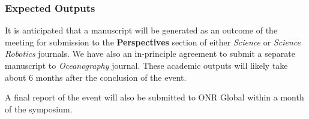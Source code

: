 \subsubsection{Expected Outputs}

It is anticipated that a manuscript will be generated as an outcome of
the meeting for submission to the \textbf{Perspectives} section of
either \emph{Science} or \emph{Science Robotics} journals. We have
also an in-principle agreement to submit a separate manuscript to
\emph{Oceanography} journal. These academic outputs will likely take
about 6 months after the conclusion of the event. 

A final report of the event will also be submitted to ONR Global
within a month of the symposium.
